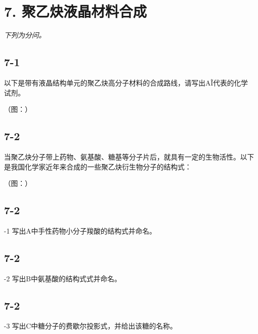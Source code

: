 \section*{7. 聚乙炔液晶材料合成}
\textit{下列为分问。}

\subsection*{7-1}
以下是带有液晶结构单元的聚⼄炔⾼分⼦材料的合成路线，请写出A\~I代表的化学试剂。

（图：）

\subsection*{7-2}
当聚⼄炔分⼦带上药物、氨基酸、糖基等分⼦⽚后，就具有⼀定的⽣物活性。以下是我国化学家近年来合成的⼀些聚⼄炔衍⽣物分⼦的结构式：

（图：）

\subsection*{7-2}
-1 写出A中⼿性药物⼩分⼦羧酸的结构式并命名。

\subsection*{7-2}
-2 写出B中氨基酸的结构式式并命名。

\subsection*{7-2}
-3 写出C中糖分⼦的费歇尔投影式，并给出该糖的名称。
